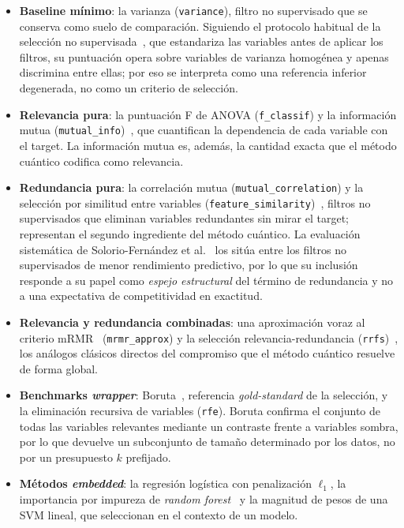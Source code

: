 \begin{itemize}
\item \textbf{Baseline mínimo}: la varianza (\texttt{variance}),
  filtro no supervisado que se conserva como suelo de comparación.
  Siguiendo el protocolo habitual de la selección no
  supervisada~\cite{solorio2020}, que estandariza las variables antes de
  aplicar los filtros, su puntuación opera sobre variables de varianza
  homogénea y apenas discrimina entre ellas; por eso se interpreta como
  una referencia inferior degenerada, no como un criterio de selección.
\item \textbf{Relevancia pura}: la puntuación F de ANOVA
  (\texttt{f\_classif}) y la información mutua
  (\texttt{mutual\_info})~\cite{cover2006}, que cuantifican la
  dependencia de cada variable con el target. La información mutua es,
  además, la cantidad exacta que el método cuántico codifica como
  relevancia.
\item \textbf{Redundancia pura}: la correlación mutua
  (\texttt{mutual\_correlation}) y la selección por similitud entre
  variables (\texttt{feature\_similarity})~\cite{solorio2020}, filtros
  no supervisados que eliminan variables redundantes sin mirar el
  target; representan el segundo ingrediente del método cuántico. La
  evaluación sistemática de Solorio-Fernández et al.~\cite{solorio2020}
  los sitúa entre los filtros no supervisados de menor rendimiento
  predictivo, por lo que su inclusión responde a su papel como
  \emph{espejo estructural} del término de redundancia y no a una
  expectativa de competitividad en exactitud.
\item \textbf{Relevancia y redundancia combinadas}: una aproximación
  voraz al criterio mRMR~\cite{peng2005} (\texttt{mrmr\_approx}) y la
  selección relevancia-redundancia (\texttt{rrfs})~\cite{solorio2020},
  los análogos clásicos directos del compromiso que el método cuántico
  resuelve de forma global.
\item \textbf{Benchmarks \textit{wrapper}}: Boruta~\cite{kursa2010},
  referencia \textit{gold-standard} de la selección, y la eliminación
  recursiva de variables (\texttt{rfe}). Boruta confirma el conjunto de
  todas las variables relevantes mediante un contraste frente a
  variables sombra, por lo que devuelve un subconjunto de tamaño
  determinado por los datos, no por un presupuesto $k$ prefijado.
\item \textbf{Métodos \textit{embedded}}: la regresión logística con
  penalización $\ell_1$, la importancia por impureza de \textit{random
  forest}~\cite{breiman2001} y la magnitud de pesos de una SVM lineal,
  que seleccionan en el contexto de un modelo.
\end{itemize}

